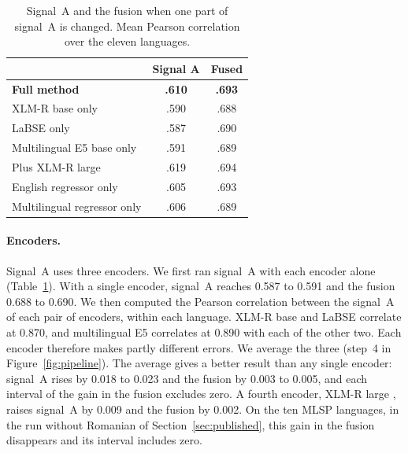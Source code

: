 \documentclass[11pt]{article}
\begin{document}
\begin{table}[t]
\centering
\small
\setlength{\tabcolsep}{2.5pt}
\begin{tabular}{lcc}
\toprule
 & Signal A & Fused \\
\midrule
\textbf{Full method}              & \textbf{.610} & \textbf{.693} \\ %
\midrule
XLM-R base only                   & .590 & .688 \\ %
LaBSE only                        & .587 & .690 \\ %
Multilingual E5 base only         & .591 & .689 \\ %
Plus XLM-R large                  & .619 & .694 \\ %
\midrule
English regressor only            & .605 & .693 \\ %
Multilingual regressor only       & .606 & .689 \\ %
\bottomrule
\end{tabular}
\caption{Signal~A and the fusion when one part of signal~A is changed. Mean Pearson correlation
over the eleven languages.}
\label{tab:signal-a}
\end{table}

\paragraph{Encoders.} Signal~A uses three encoders. We first ran signal~A with each encoder alone %
(Table~\ref{tab:signal-a}). With a single encoder, signal~A reaches 0.587 to 0.591 and the fusion %
0.688 to 0.690. We then computed the Pearson correlation between the signal~A of each pair of
encoders, within each language. XLM-R base and LaBSE correlate at 0.870, and multilingual E5 correlates %
at 0.890 with each of the other two. Each encoder therefore makes partly different errors. We
average the three (step~4 in Figure~\ref{fig:pipeline}). The average gives a better result than any %
single encoder: signal~A rises by 0.018 to 0.023 and the fusion by 0.003 to 0.005, and each %
interval of the gain in the fusion excludes zero. A fourth encoder, XLM-R large %
\citep{conneau2020xlmr}, raises signal~A by 0.009 and the fusion by 0.002. On the ten MLSP %
languages, in the run without Romanian of Section~\ref{sec:published}, this gain in the fusion %
disappears and its interval includes zero.
\end{document}
